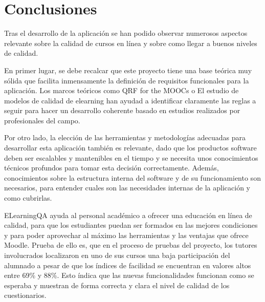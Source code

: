 
\section{Conclusiones}
Tras el desarrollo de la aplicación se han podido observar numerosos aspectos relevante sobre la calidad de cursos en línea y sobre como llegar a buenos niveles de calidad. 

En primer lugar, se debe recalcar que este proyecto tiene una base teórica muy sólida que facilita inmensamente la definición de requisitos funcionales para la aplicación. Los marcos teóricos como QRF for the MOOCs \cite{quality-reference-framework} o El estudio de modelos de calidad de elearning \cite{modelos-calidad-elearning} han ayudad a identificar claramente las reglas a seguir para hacer un desarrollo coherente basado en estudios realizados por profesionales del campo. 

Por otro lado, la elección de las herramientas y metodologías adecuadas para desarrollar esta aplicación también es relevante, dado que los productos software deben ser escalables y mantenibles en el tiempo y se necesita unos conocimientos técnicos profundos para tomar esta decisión correctamente. Además, conocimientos sobre la estructura interna del software y de su funcionamiento son necesarios, para entender cuales son las necesidades internas de la aplicación y como cubrirlas. 

ELearningQA ayuda al personal académico a ofrecer una educación en línea de calidad, para que los estudiantes puedan ser formados en las mejores condiciones y para poder aprovechar al máximo las herramientas y las ventajas que ofrece Moodle. Prueba de ello es, que en el proceso de pruebas del proyecto, los tutores involucrados localizaron en uno de sus cursos una baja participación  del alumnado a pesar de que los índices de facilidad se encuentran en valores altos entre 69\% y 88\%. Esto índica que las nuevas funcionalidades funcionan como se esperaba  y muestran de forma correcta y clara el nivel de calidad de los cuestionarios.

